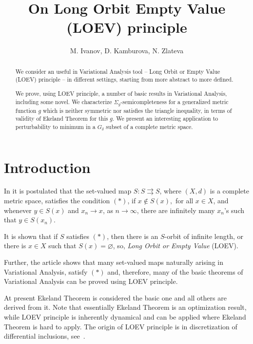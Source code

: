 \documentclass[12pt]{article}
\renewcommand{\emptyset}{\varnothing}
\begin{document}

\title{On Long Orbit Empty Value (LOEV) principle}

\author{M. Ivanov, D. Kamburova, N. Zlateva}
\date{}

\maketitle

\begin{abstract}
We consider an useful in Variational Analysis tool -- Long Orbit or Empty Value (LOEV) principle -- in different settings, starting from more abstract to more defined.

We prove, using LOEV principle, a number of basic results in Variational Analysis, including some novel. We characterize $\Sigma_g$-semicompleteness for a generalized metric function $g$ which is neither symmetric nor satisfies the triangle inequality, in terms of validity of Ekeland Theorem for this $g$. We present an interesting application to perturbability to minimum in a $G_\delta$ subset of a complete metric space.
\end{abstract}


\section{Introduction}\label{sec:intro}

In \cite{Ivanov-Zlateva} it is postulated that the set-valued map $S: S \rightrightarrows S$, where $(X,d)$ is a complete metric space, satisfies the condition $(\ast)$, if $x \notin S(x),$ for all $x \in X$, and whenever $y \in S(x)$ and $x_n \to x$, as $n\to\infty$, there are infinitely many $x_n$'s such that
$y \in S (x_n)$.

It is shown that if $S$ satisfies $(\ast)$, then there is an $S$-orbit of infinite length, or there is  $x\in X$ such that $S(x)=\emptyset$, so, \emph{Long Orbit or Empty Value} (LOEV).

Further, the article \cite{Ivanov-Zlateva} shows that many set-valued maps naturally arising in Variational Analysis, satisfy $(\ast)$ and, therefore, many of the basic theorems of Variational Analysis can be proved using LOEV principle.

At present Ekeland Theorem is considered the basic one and all others are derived from it. Note that essentially Ekeland Theorem is an optimization result, while LOEV principle is inherently dynamical and can be applied where Ekeland Theorem is hard to apply. The origin of LOEV principle is in discretization of differential inclusions, see~\cite{iz-cled}.
\end{document}
